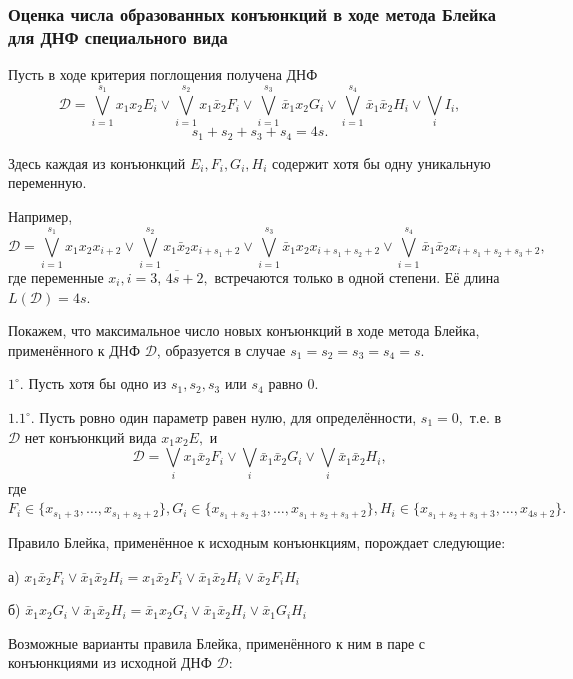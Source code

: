 \documentclass[12pt,a4paper,oneside,fleqn,leqno]{article}
\theoremstyle{definition}
\begin{document}
	\subsubsection*{Оценка числа образованных конъюнкций в ходе метода Блейка для ДНФ специального вида}
			Пусть в ходе критерия поглощения получена ДНФ
			$$
				\mathcal{D} = \bigvee_{i = 1}^{s_1}x_1x_2E_i \vee \bigvee_{i = 1}^{s_2}x_1\bar{x}_2F_i \vee \bigvee_{i = 1}^{s_3}\bar{x}_1x_2G_i \vee \bigvee_{i = 1}^{s_4}\bar{x}_1\bar{x}_2H_i \vee \bigvee_iI_i,
			$$
			$$
				s_1 + s_2 + s_3 + s_4 = 4s.
			$$\par
			Здесь каждая из конъюнкций $E_i, F_i, G_i, H_i$ содержит хотя бы одну уникальную переменную.\par
			Например,
			$$
				\mathcal{D} = \bigvee\limits_{i = 1}^{s_1}x_1x_2x_{i +2} \vee \bigvee\limits_{i = 1}^{s_2}x_1\bar{x}_2x_{i + s_1 + 2} \vee \bigvee\limits_{i = 1}^{s_3}\bar{x}_1x_2x_{i + s_1 + s_2 + 2} \vee \bigvee\limits_{i = 1}^{s_4}\bar{x}_1\bar{x}_2x_{i + s_1 + s_2 + s_3 + 2},
			$$
			где переменные $x_i, i = \overline{3,\,4s+2},$ встречаются только в одной степени. Её длина $L(\mathcal{D}) = 4s.$\par
			Покажем, что максимальное число новых конъюнкций в ходе метода Блейка, применённого к ДНФ $\mathcal{D}$, образуется в случае $s_1 = s_2 = s_3 = s_4 = s.$\par
			$1^{\circ}.$ Пусть хотя бы одно из $s_1, s_2, s_3$ или $s_4$ равно 0.\par
			$1.1^{\circ}.$ Пусть ровно один параметр равен нулю, для определённости, $s_1 = 0,$ т.е. в $\mathcal{D}$ нет конъюнкций вида $x_1x_2E,$ и
			$$\mathcal{D} = \bigvee_ix_1\bar{x}_2F_i \vee \bigvee_i\bar{x}_1\bar{x}_2G_i \vee \bigvee_i\bar{x}_1\bar{x}_2H_i,$$
			где $F_i \in \{x_{s_1 + 3}, \ldots, x_{s_1 + s_2 + 2}\}, G_i \in \{x_{s_1 + s_2 + 3}, \ldots, x_{s_1 + s_2 + s_3 + 2}\}, H_i \in \{x_{s_1 + s_2  + s_3 + 3}, \ldots, x_{4s + 2}\}.$\par
			Правило Блейка, применённое к исходным конъюнкциям, порождает следующие:\par
			а) $x_1\bar{x}_2F_i \vee \bar{x}_1\bar{x}_2H_i = x_1\bar{x}_2F_i \vee \bar{x}_1\bar{x}_2H_i \vee \bar{x}_2F_iH_i$\par
			б) $\bar{x}_1x_2G_i \vee \bar{x}_1\bar{x}_2H_i = \bar{x}_1x_2G_i \vee \bar{x}_1\bar{x}_2H_i \vee \bar{x}_1G_iH_i$\par
			Возможные варианты правила Блейка, применённого к ним в паре с конъюнкциями из исходной ДНФ $\mathcal{D}:$\par
\end{document}
